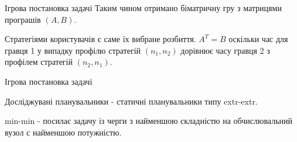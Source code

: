 \begin{frame}{Ігрова постановка задачі}
	\manimate
	Таким чином отримано біматричну гру з матрицями програшів $(A,B)$.
	
	Стратегіями користувачів є саме їх вибране розбиття. $A^T = B$ оскільки час для гравця 1 у випадку профілю стратегій $(n_1, n_2)$ дорівнює часу гравця 2 з профілем стратегій $(n_2, n_1)$.
	
\end{frame}

\begin{frame}{Ігрова постановка задачі}
\manimate

	Досліджувані планувальники - статичні планувальники типу extr-extr.
	
	min-min - посилає задачу із черги з найменшою складністю на обчислювальний вузол с найменшою потужністю.

\end{frame}